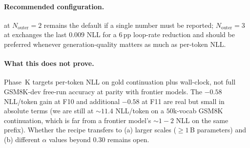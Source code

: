 \paragraph{Recommended configuration.}
 at $N_\text{outer}{=}2$ remains the default if a single
number must be reported; $N_\text{outer}{=}3$ at 
exchanges the last $0.009$ NLL for a $6$\,pp loop-rate reduction and
should be preferred whenever generation-quality matters as much as
per-token NLL.

\paragraph{What this does not prove.}
Phase~K targets per-token NLL on gold continuation plus wall-clock,
not full GSM8K-dev free-run accuracy at parity with frontier models.
The $-0.58$ NLL/token gain at F10 and additional $-0.58$ at F11 are
real but small in absolute terms (we are still at $\sim 11.4$ NLL/token
on a $50$k-vocab GSM8K continuation, which is far from a frontier
model's $\sim 1{-}2$ NLL on the same prefix). Whether the recipe
transfers to (a) larger scales ($\geq 1$\,B parameters) and
(b) different $\alpha$ values beyond $0.30$ remains open.
